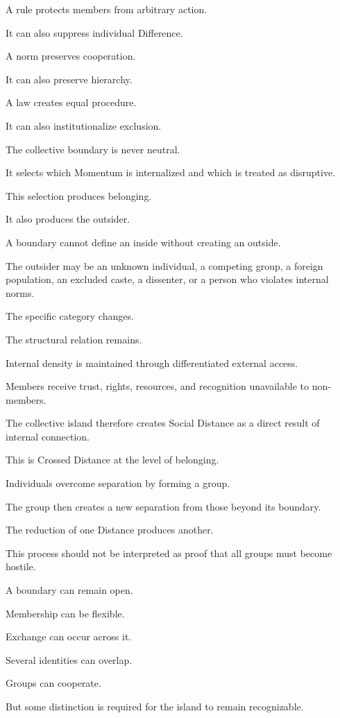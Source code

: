 A rule protects members from arbitrary action.

It can also suppress individual Difference.

A norm preserves cooperation.

It can also preserve hierarchy.

A law creates equal procedure.

It can also institutionalize exclusion.

The collective boundary is never neutral.

It selects which Momentum is internalized and which is treated as disruptive.

This selection produces belonging.

It also produces the outsider.

A boundary cannot define an inside without creating an outside.

The outsider may be an unknown individual, a competing group, a foreign population, an excluded caste, a dissenter, or a person who violates internal norms.

The specific category changes.

The structural relation remains.

Internal density is maintained through differentiated external access.

Members receive trust, rights, resources, and recognition unavailable to non-members.

The collective island therefore creates Social Distance as a direct result of internal connection.

This is Crossed Distance at the level of belonging.

Individuals overcome separation by forming a group.

The group then creates a new separation from those beyond its boundary.

The reduction of one Distance produces another.

This process should not be interpreted as proof that all groups must become hostile.

A boundary can remain open.

Membership can be flexible.

Exchange can occur across it.

Several identities can overlap.

Groups can cooperate.

But some distinction is required for the island to remain recognizable.

